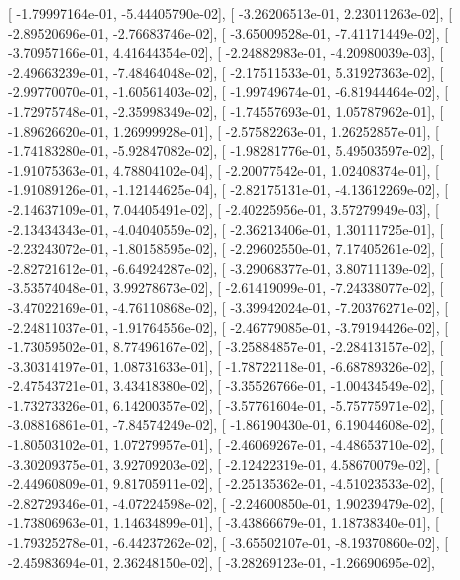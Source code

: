 \documentclass{article}
\begin{document}
       [ -1.79997164e-01,  -5.44405790e-02],
       [ -3.26206513e-01,   2.23011263e-02],
       [ -2.89520696e-01,  -2.76683746e-02],
       [ -3.65009528e-01,  -7.41171449e-02],
       [ -3.70957166e-01,   4.41644354e-02],
       [ -2.24882983e-01,  -4.20980039e-03],
       [ -2.49663239e-01,  -7.48464048e-02],
       [ -2.17511533e-01,   5.31927363e-02],
       [ -2.99770070e-01,  -1.60561403e-02],
       [ -1.99749674e-01,  -6.81944464e-02],
       [ -1.72975748e-01,  -2.35998349e-02],
       [ -1.74557693e-01,   1.05787962e-01],
       [ -1.89626620e-01,   1.26999928e-01],
       [ -2.57582263e-01,   1.26252857e-01],
       [ -1.74183280e-01,  -5.92847082e-02],
       [ -1.98281776e-01,   5.49503597e-02],
       [ -1.91075363e-01,   4.78804102e-04],
       [ -2.20077542e-01,   1.02408374e-01],
       [ -1.91089126e-01,  -1.12144625e-04],
       [ -2.82175131e-01,  -4.13612269e-02],
       [ -2.14637109e-01,   7.04405491e-02],
       [ -2.40225956e-01,   3.57279949e-03],
       [ -2.13434343e-01,  -4.04040559e-02],
       [ -2.36213406e-01,   1.30111725e-01],
       [ -2.23243072e-01,  -1.80158595e-02],
       [ -2.29602550e-01,   7.17405261e-02],
       [ -2.82721612e-01,  -6.64924287e-02],
       [ -3.29068377e-01,   3.80711139e-02],
       [ -3.53574048e-01,   3.99278673e-02],
       [ -2.61419099e-01,  -7.24338077e-02],
       [ -3.47022169e-01,  -4.76110868e-02],
       [ -3.39942024e-01,  -7.20376271e-02],
       [ -2.24811037e-01,  -1.91764556e-02],
       [ -2.46779085e-01,  -3.79194426e-02],
       [ -1.73059502e-01,   8.77496167e-02],
       [ -3.25884857e-01,  -2.28413157e-02],
       [ -3.30314197e-01,   1.08731633e-01],
       [ -1.78722118e-01,  -6.68789326e-02],
       [ -2.47543721e-01,   3.43418380e-02],
       [ -3.35526766e-01,  -1.00434549e-02],
       [ -1.73273326e-01,   6.14200357e-02],
       [ -3.57761604e-01,  -5.75775971e-02],
       [ -3.08816861e-01,  -7.84574249e-02],
       [ -1.86190430e-01,   6.19044608e-02],
       [ -1.80503102e-01,   1.07279957e-01],
       [ -2.46069267e-01,  -4.48653710e-02],
       [ -3.30209375e-01,   3.92709203e-02],
       [ -2.12422319e-01,   4.58670079e-02],
       [ -2.44960809e-01,   9.81705911e-02],
       [ -2.25135362e-01,  -4.51023533e-02],
       [ -2.82729346e-01,  -4.07224598e-02],
       [ -2.24600850e-01,   1.90239479e-02],
       [ -1.73806963e-01,   1.14634899e-01],
       [ -3.43866679e-01,   1.18738340e-01],
       [ -1.79325278e-01,  -6.44237262e-02],
       [ -3.65502107e-01,  -8.19370860e-02],
       [ -2.45983694e-01,   2.36248150e-02],
       [ -3.28269123e-01,  -1.26690695e-02],
\end{document}

